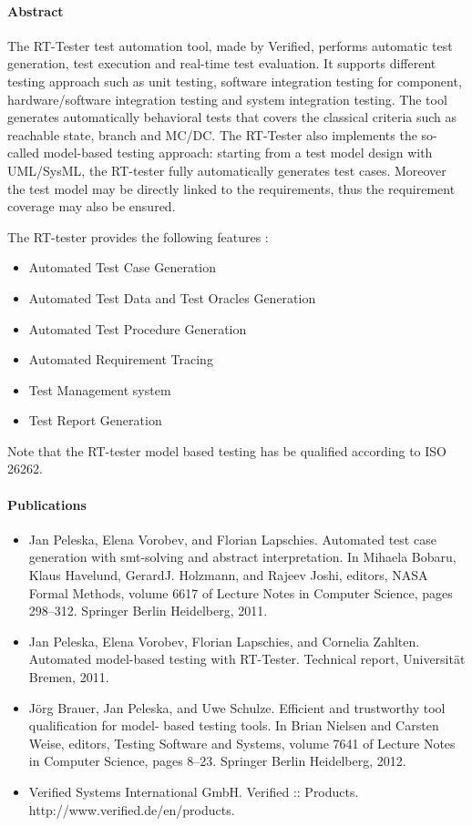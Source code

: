 \paragraph{Abstract}
The RT-Tester test automation tool, made by Verified, performs
automatic test generation, test execution and real-time test
evaluation.  It supports different testing approach such as unit
testing, software integration testing for component, hardware/software
integration testing and system integration testing.  
The tool generates automatically behavioral tests that covers the
classical criteria such as  reachable state, branch and MC/DC.
The RT-Tester also implements the so-called  model-based testing approach: 
starting from a test model design with UML/SysML, the RT-tester fully
automatically generates test cases. Moreover the test model may be
directly linked to the requirements, thus the requirement coverage may
also be ensured.

The RT-tester provides the following features :
\begin{itemize}
\item Automated Test Case Generation 
\item Automated Test Data and Test Oracles Generation 
\item Automated Test Procedure Generation 
\item Automated Requirement Tracing 
\item Test Management system 
\item Test Report Generation
\end{itemize}


Note that the RT-tester model based testing has be qualified according
to ISO 26262.

\paragraph{Publications}

\begin{itemize}
\item Jan Peleska, Elena Vorobev, and Florian Lapschies. Automated test case generation with smt-solving
and abstract interpretation. In Mihaela Bobaru, Klaus Havelund, GerardJ. Holzmann, and Rajeev
Joshi, editors, NASA Formal Methods, volume 6617 of Lecture Notes in Computer Science, pages
298–312. Springer Berlin Heidelberg, 2011.
\item Jan Peleska, Elena Vorobev, Florian Lapschies, and Cornelia Zahlten. Automated model-based
testing with RT-Tester. Technical report, Universität Bremen, 2011.
\item Jörg Brauer, Jan Peleska, and Uwe Schulze. Efficient and trustworthy tool qualification for model-
based testing tools. In Brian Nielsen and Carsten Weise, editors, Testing Software and Systems,
volume 7641 of Lecture Notes in Computer Science, pages 8–23. Springer Berlin Heidelberg, 2012.
\item Verified Systems International GmbH. Verified :: Products. http://www.verified.de/en/products.


\end{itemize} 

